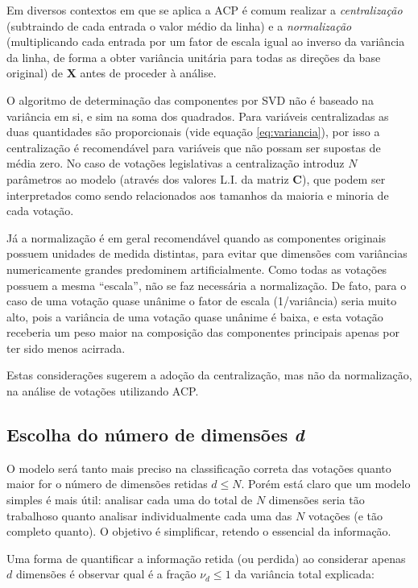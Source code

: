 \documentclass[a4paper, 12pt]{article}
\begin{document}
Em diversos contextos em que se aplica a ACP é comum realizar a \emph{centralização} (subtraindo de cada entrada o valor médio da linha) e a \emph{normalização} (multiplicando cada entrada por um fator de escala igual ao inverso da variância da linha, de forma a obter variância unitária para todas as direções da base original) de $\mathbf{X}$ antes de proceder à análise.

O algoritmo de determinação das componentes por SVD não é baseado na variância em si, e sim na soma dos quadrados. Para variáveis centralizadas as duas quantidades são proporcionais (vide equação \ref{eq:variancia}), por isso a centralização é recomendável para variáveis que não possam ser supostas de média zero. No caso de votações legislativas a centralização introduz $N$ parâmetros ao modelo (através dos valores L.I. da matriz $\mathbf{C}$), que podem ser interpretados como sendo relacionados aos tamanhos da maioria e minoria de cada votação.

Já a normalização é em geral recomendável quando as componentes originais possuem unidades de medida distintas, para evitar que dimensões com variâncias numericamente grandes predominem artificialmente. Como todas as votações possuem a mesma ``escala'', não se faz necessária a normalização. De fato, para o caso de uma votação quase unânime o fator de escala (1/variância) seria muito alto, pois a variância de uma votação quase unânime é baixa, e esta votação receberia um peso maior na composição das componentes principais apenas por ter sido menos acirrada.

Estas considerações sugerem a adoção da centralização, mas não da normalização, na análise de votações utilizando ACP.

\subsection{Escolha do número de dimensões \emph{d}}

O modelo será tanto mais preciso na classificação correta das votações quanto maior for o número de dimensões retidas $d \leq N$. Porém está claro que um modelo simples é mais útil: analisar cada uma do total de $N$ dimensões seria tão trabalhoso quanto analisar individualmente cada uma das $N$ votações (e tão completo quanto). O objetivo é simplificar, retendo o essencial da informação.

Uma forma de quantificar a informação retida (ou perdida) ao considerar apenas $d$ dimensões é observar qual é a fração $\nu_d \leq 1$ da variância total explicada:
\end{document}
